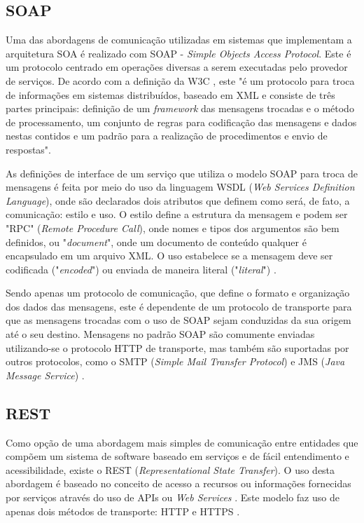 \subsection{SOAP}
Uma das abordagens de comunicação utilizadas em sistemas que implementam a arquitetura SOA é realizado com SOAP - \textit{Simple Objects Access Protocol}. Este é um protocolo centrado em operações diversas a serem executadas pelo provedor de serviços. De acordo com a definição da W3C \cite{box_simple_2000}, este "é um protocolo para troca de informações em sistemas distribuídos, baseado em XML e consiste de três partes principais: definição de um \textit{framework} das mensagens trocadas e o método de processamento, um conjunto de regras para codificação das mensagens e dados nestas contidos e um padrão para a realização de procedimentos e envio de respostas".

As definições de interface de um serviço que utiliza o modelo SOAP para troca de mensagens é feita por meio do uso da linguagem WSDL (\textit{Web Services Definition Language}), onde são declarados dois atributos que definem como será, de fato, a comunicação: estilo e uso. O estilo define a estrutura da mensagem e podem ser "RPC" (\textit{Remote Procedure Call}), onde nomes e tipos dos argumentos são bem definidos, ou "\textit{document}", onde um documento de conteúdo qualquer é encapsulado em um arquivo XML. O uso estabelece se a mensagem deve ser codificada ("\textit{encoded}") ou enviada de maneira literal ("\textit{literal}") \cite{Bianco2007}.

Sendo apenas um protocolo de comunicação, que define o formato e organização dos dados das mensagens, este é dependente de um protocolo de transporte para que as mensagens trocadas com o uso de SOAP sejam conduzidas da sua origem até o seu destino. Mensagens no padrão SOAP são comumente enviadas utilizando-se o protocolo HTTP de transporte, mas também são suportadas por outros protocolos, como o SMTP (\textit{Simple Mail Transfer Protocol}) e JMS (\textit{Java Message Service}) \cite{mueller_understanding_2013}.

\subsection{REST}
Como opção de uma abordagem mais simples de comunicação entre entidades que compõem um sistema de software baseado em serviços e de fácil entendimento e acessibilidade, existe o REST (\textit{Representational State Transfer}). O uso desta abordagem é baseado no conceito de acesso a recursos ou informações fornecidas por serviços através do uso de APIs ou \textit{Web Services} \cite{Bianco2007}. Este modelo faz uso de apenas dois métodos de transporte: HTTP e HTTPS \cite{rozlog_restesoap_2013}.

